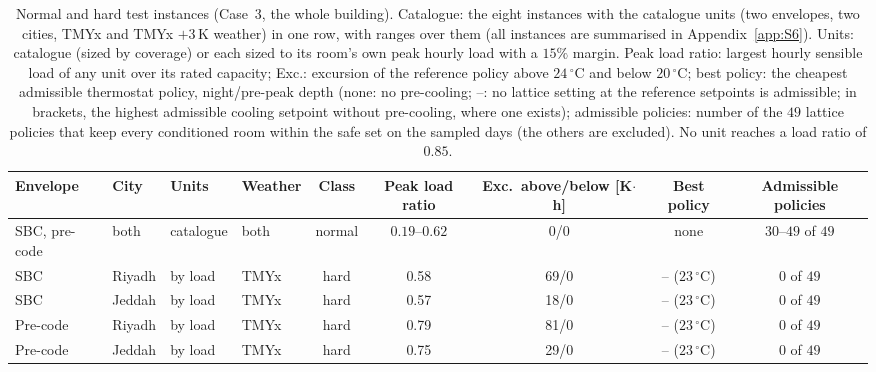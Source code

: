 \documentclass[10pt,a4paper,twocolumn]{article}
\theoremstyle{definition}
\begin{document}
\begin{table}[t]
\centering\footnotesize\setlength{\tabcolsep}{3pt}
\caption{Normal and hard test instances (Case~3, the whole building). Catalogue: the eight instances with the catalogue units (two envelopes, two cities, TMYx and TMYx $+3\,$K weather) in one row, with ranges over them (all instances are summarised in Appendix~\ref{app:S6}). Units: catalogue (sized by coverage) or each sized to its room's own peak hourly load with a $15\%$ margin. Peak load ratio: largest hourly sensible load of any unit over its rated capacity; Exc.: excursion of the reference policy above $24\,^{\circ}$C and below $20\,^{\circ}$C; best policy: the cheapest admissible thermostat policy, night/pre-peak depth (none: no pre-cooling; --: no lattice setting at the reference setpoints is admissible; in brackets, the highest admissible cooling setpoint without pre-cooling, where one exists); admissible policies: number of the $49$ lattice policies that keep every conditioned room within the safe set on the sampled days (the others are excluded). No unit reaches a load ratio of $0.85$.}
\label{tab:instances}
\begin{tabularx}{\linewidth}{l l l l c c c c C}
\toprule
Envelope & City & Units & Weather & Class & Peak load ratio & Exc.\ above/below [K$\cdot$h] & Best policy & Admissible policies \\
\midrule
SBC, pre-code & both & catalogue & both & normal & $0.19$--$0.62$ & 0/0 & none & $30$--$49$ of $49$ \\
\midrule
SBC & Riyadh & by load & TMYx & hard & 0.58 & 69/0 & -- ($23\,^{\circ}$C) & $0$ of $49$ \\
SBC & Jeddah & by load & TMYx & hard & 0.57 & 18/0 & -- ($23\,^{\circ}$C) & $0$ of $49$ \\
Pre-code & Riyadh & by load & TMYx & hard & 0.79 & 81/0 & -- ($23\,^{\circ}$C) & $0$ of $49$ \\
Pre-code & Jeddah & by load & TMYx & hard & 0.75 & 29/0 & -- ($23\,^{\circ}$C) & $0$ of $49$ \\
\bottomrule
\end{tabularx}
\end{table}
\end{document}
